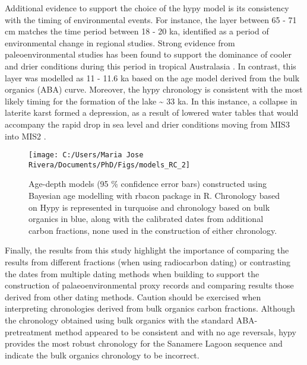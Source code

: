 \documentclass[
  12pt,
]{book}
\begin{document}
Additional evidence to support the choice of the hypy model is its consistency with the timing of environmental events. For instance, the layer between 65 - 71 cm matches the time period between 18 - 20 ka, identified as a period of environmental change in regional studies. Strong evidence from paleoenvironmental studies has been found to support the dominance of cooler and drier conditions during this period in tropical Australasia \citep{reevesPalaeoenvironmentalChangeTropical2013, turneyGeochemicalChangesRecorded2006a, burrowsNewLateQuaternary2016a}. In contrast, this layer was modelled as 11 - 11.6 ka based on the age model derived from the bulk organics (ABA) curve. Moreover, the hypy chronology is consistent with the most likely timing for the formation of the lake \textasciitilde{} 33 ka. In this instance, a collapse in laterite karst formed a depression, as a result of lowered water tables that would accompany the rapid drop in sea level and drier conditions moving from MIS3 into MIS2 \citep{xuSealevelChangeDriver2019}.

\begin{figure}

{\centering \texttt{[image: C:/Users/Maria Jose Rivera/Documents/PhD/Figs/models\_RC\_2]} 

}

\caption{Age-depth models (95 \% confidence error bars) constructed using Bayesian age modelling with rbacon package in R. Chronology based on Hypy is represented in turquoise and chronology based on bulk organics in blue, along with the calibrated dates from additional carbon fractions, none used in the construction of either chronology.}\label{fig:modelsb}
\end{figure}



Finally, the results from this study highlight the importance of comparing the results from different fractions (when using radiocarbon dating) or contrasting the dates from multiple dating methods when building to support the construction of palaeoenvironmental proxy records and comparing results those derived from other dating methods. Caution should be exercised when interpreting chronologies derived from bulk organics carbon fractions. Although the chronology obtained using bulk organics with the standard ABA-pretreatment method appeared to be consistent and with no age reversals, hypy provides the most robust chronology for the Sanamere Lagoon sequence and indicate the bulk organics chronology to be incorrect.
\end{document}
